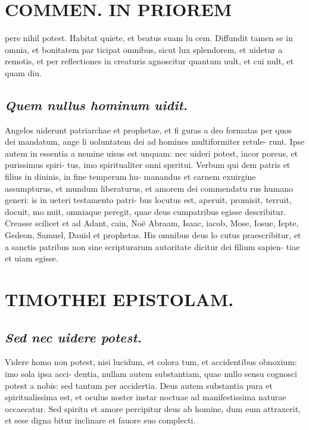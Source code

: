 \documentclass{article}
\begin{document}
\begin{pages}
\section*{COMMEN. IN PRIOREM }
\marginpar{[ p.178 ]}\pstart pere nihil potest. Habitat quiete, et beatus suam lu cem. Diffundit tamen se in omnia, et bonitatem par ticipat omnibus, sicut lux splendorem, et uidetur a remotis, et per reflectiones in creaturis agnoscitur quantum uult, et cui nult, et quam diu.  \pend
{}
{}
\subsection*{\textit{Quem nullus hominum uidit. }}\pstart Angelos uiderunt patriarchae et prophetae, et fi guras a deo formatas per quos dei mandatum, ange li uoluntatem dei ad homines multiformiter retule- runt. Ipse autem in essentia a nemine uisus est unquam: nec uideri potest, incor poreus, et purissimus spiri- tus, imo spiritualiter onni sprritui. Verbum qui dem patris et filius in diuinis, in fine temperum hu- manandus et carnem exuirgine assumpturus, et mundum liberaturus, et amorem dei commendatu rus humano generi: is in ueteri testamento patri- bus locutus est, aperuit, promisit, terruit, docuit, mo nuit, omniaque peregit, quae deus cumpatribus egisse describitur. Creasse scilicet et ad Adant, cain, Noë Abraam, Isaac, iacob, Mose, Iosue, Iepte, Gedeon, Samuel, Dauid et prophetas. His omnibus deus lo cutus praescribitur, et a sanctis patribus non sine scripturarum autoritate dicitur dei filium sapien- tiae et uiam egisse.  \pend
\section*{TIMOTHEI EPISTOLAM. }
\marginpar{[ p.179 ]}
{}
\subsection*{\textit{Sed nec uidere potest. }}\pstart Videre homo non potest, nisi lucidum, et colora tum, et accidentibus obnoxium: imo sola ipsa acci- dentia, nullam autem substantiam, quae nullo sensu cognosci potest a nobis: sed tantum per accidertia. Deus autem substantia pura et spiritualissima est, et oculus noster instar noctuae ad manifestissima naturae occaecatur. Sed spiritu et amore percipitur deus ab homine, dum eum attraxerit, et sese digna bitur inclinare et fauore suo complecti.  \pend
{}
{}

\end{pages}
\end{document}
